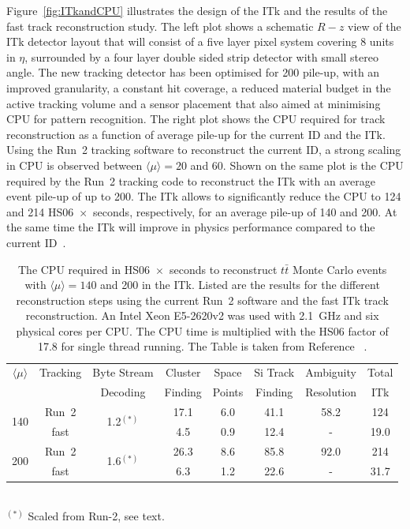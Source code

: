 Figure~\ref{fig:ITkandCPU} illustrates the design of the ITk and the results of the fast track reconstruction study. The left plot shows a schematic $R-z$ view of the ITk detector layout that will consist of a five layer pixel system covering 8 units in $\eta$, surrounded by a four layer double sided strip detector with small stereo angle. The new tracking detector has been optimised for 200 pile-up, with an improved granularity, a constant hit coverage, a reduced material budget in the active tracking volume and a sensor placement that also aimed at minimising CPU for pattern recognition. The right plot shows the CPU required for track reconstruction as a function of average pile-up for the current ID and the ITk. Using the Run~2 tracking software to reconstruct the current ID, a strong scaling in CPU is observed between $\langle\mu\rangle = 20$ and $60$. Shown on the same plot is the CPU required by the Run~2 tracking code to reconstruct the ITk with an average event pile-up of up to 200. The ITk allows to significantly reduce the CPU to 124 and 214 HS06~$\times$~seconds, respectively, for an average pile-up of 140 and 200. At the same time the ITk will improve in physics performance compared to the current ID~\cite{ATL-PHYS-PUB-2019-014}.
%
\begin{table}[htb!]
  \caption{The CPU required in HS06~$\times$~seconds to reconstruct $t\bar{t}$ Monte Carlo events with $\langle\mu\rangle = 140$ and 200 in the ITk. Listed are the results for the different reconstruction steps using the current Run~2 software and the fast ITk track reconstruction. An Intel Xeon E5-2620v2 was used with 2.1~GHz and six physical cores per CPU. The CPU time is multiplied with the HS06 factor of 17.8 for single thread running. The Table is taken from Reference ~\cite{ATL-PHYS-PUB-2019-041}.}
  \label{tab:FastTrackCPU}
  \centering
  \begin{tabular}{|c|c||c|c|c|c|c||c|} \hline
   $\langle\mu\rangle$  & Tracking & Byte Stream                  & Cluster     & Space  & Si Track & Ambiguity  & Total \\
                        &          & Decoding                     & Finding     & Points & Finding  & Resolution & ITk   \\ \hline
   \multirow{2}{*}{140} &  Run~2   & \multirow{2}{*}{1.2$^{(*)}$}  & 17.1        & 6.0    & 41.1     &  58.2      & 124 \\
                        &  fast    &                              & 4.5         & 0.9    & 12.4     &  -         &  19.0 \\ \hline
   \multirow{2}{*}{200} &  Run~2   &  \multirow{2}{*}{1.6$^{(*)}$} & 26.3        & 8.6    & 85.8     &  92.0      & 214 \\
                        &  fast    &                              & 6.3         & 1.2    & 22.6     &  -         &  31.7 \\ \hline
  \end{tabular} \\
  $^{(*)}$ {\tiny Scaled from Run-2, see text.}
\end{table}

